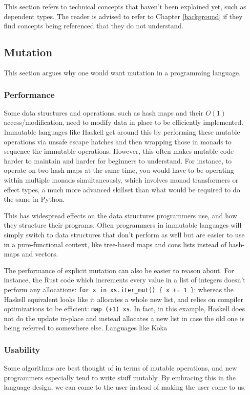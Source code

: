 \documentclass[12pt,twoside]{report}
\begin{document}
This section refers to technical concepts that haven't been explained yet, such as dependent types. The reader is advised to refer to Chapter \ref*{background} if they find concepts being referenced that they do not understand.

\subsection{Mutation}
This section argues why one would want mutation in a programming language.

\subsubsection{Performance}
Some data structures and operations, such as hash maps and their $O(1)$ access/modification, need to modify data in place to be efficiently implemented. Immutable languages like Haskell get around this by performing these mutable operations via unsafe escape hatches and then wrapping those in monads to sequence the immutable operations. However, this often makes mutable code harder to maintain and harder for beginners to understand. For instance, to operate on two hash maps at the same time, you would have to be operating within multiple monads simultaneously, which involves monad transformers or effect types, a much more advanced skillset than what would be required to do the same in Python.

This has widespread effects on the data structures programmers use, and how they structure their programs. Often programmers in immutable languages will simply switch to data structures that don't perform as well but are easier to use in a pure-functional context, like tree-based maps and cons lists instead of hash-maps and vectors.

The performance of explicit mutation can also be easier to reason about. For instance, the Rust code which increments every value in a list of integers doesn't perform any allocations: \verb|for x in xs.iter_mut() { x += 1 }|; whereas the Haskell equivalent looks like it allocates a whole new list, and relies on compiler optimizations to be efficient: \verb|map (+1) xs|. In fact, in this example, Haskell does not do the update in-place and instead allocates a new list in case the old one is being referred to somewhere else. Languages like Koka

\subsubsection{Usability}
Some algorithms are best thought of in terms of mutable operations, and new programmers especially tend to write stuff mutably. By embracing this in the language design, we can come to the user instead of making the user come to us.
\end{document}
